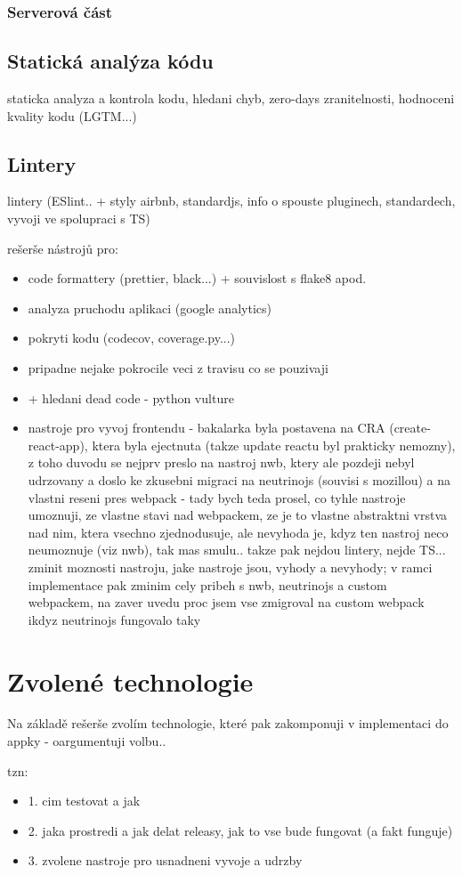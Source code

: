 \subsection{Serverová část}

\section{Statická analýza kódu}
staticka analyza a kontrola kodu, hledani chyb, zero-days zranitelnosti, hodnoceni kvality kodu (LGTM...)

\section{Lintery}
lintery (ESlint.. + styly airbnb, standardjs, info o spouste pluginech, standardech, vyvoji ve spolupraci s TS)



rešerše nástrojů pro:
\begin{itemize}
\item code formattery (prettier, black...) + souvislost s flake8 apod.
\item analyza pruchodu aplikaci (google analytics)
\item pokryti kodu (codecov, coverage.py...)
\item pripadne nejake pokrocile veci z travisu co se pouzivaji
\item + hledani dead code - python vulture
\item nastroje pro vyvoj frontendu - bakalarka byla postavena na CRA (create-react-app), ktera byla ejectnuta (takze update reactu byl prakticky nemozny), z toho duvodu se nejprv preslo na nastroj nwb, ktery ale pozdeji nebyl udrzovany a doslo ke zkusebni migraci na neutrinojs (souvisi s mozillou) a na vlastni reseni pres webpack - tady bych teda prosel, co tyhle nastroje umoznuji, ze vlastne stavi nad webpackem, ze je to vlastne abstraktni vrstva nad nim, ktera vsechno zjednodusuje, ale nevyhoda je, kdyz ten nastroj neco neumoznuje (viz nwb), tak mas smulu.. takze pak nejdou lintery, nejde TS... zminit moznosti nastroju, jake nastroje jsou, vyhody a nevyhody; v ramci implementace pak zminim cely pribeh s nwb, neutrinojs a custom webpackem, na zaver uvedu proc jsem vse zmigroval na custom webpack ikdyz neutrinojs fungovalo taky
\end{itemize}

\chapter{Zvolené technologie}

Na základě rešerše zvolím technologie, které pak zakomponuji v implementaci do appky - oargumentuji volbu..

tzn:

\begin{itemize}
\item 1. cim testovat a jak
\item 2. jaka prostredi a jak delat releasy, jak to vse bude fungovat (a fakt funguje)
\item 3. zvolene nastroje pro usnadneni vyvoje a udrzby
\end{itemize}